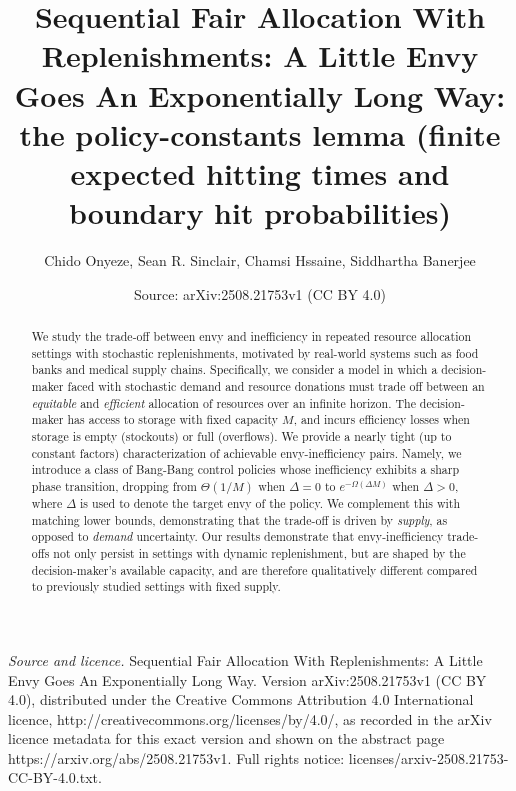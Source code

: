 \documentclass[10pt,a4paper]{amsart}
\title[Policy bounds for finite expected hitting times and boundary hit probabilities]{Sequential Fair Allocation With Replenishments: A Little Envy Goes An Exponentially Long Way: the policy-constants lemma (finite expected hitting times and boundary hit probabilities)}
\author{Chido Onyeze, Sean R. Sinclair, Chamsi Hssaine, Siddhartha Banerjee}
\date{Source: arXiv:2508.21753v1 (CC BY 4.0)}
\theoremstyle{plain}
\theoremstyle{definition}
\theoremstyle{remark}
\begin{document}
\begin{abstract}
We study the trade-off between envy and inefficiency in repeated resource allocation settings with stochastic replenishments, motivated by real-world systems such as food banks and medical supply chains. Specifically, we consider a model in which a decision-maker faced with stochastic demand and resource donations must trade off between an {\it equitable} and {\it efficient} allocation of resources over an infinite horizon. The decision-maker has access to storage with fixed capacity $M$, and incurs efficiency losses when storage is empty (stockouts) or full (overflows). We provide a nearly tight (up to constant factors) characterization of achievable envy-inefficiency pairs. Namely, we introduce a class of Bang-Bang control policies whose inefficiency exhibits a sharp phase transition, dropping from $\Theta(1/M)$ when $\Delta = 0$ to $e^{-\Omega(\Delta M)}$ when $\Delta > 0$, where $\Delta$ is used to denote the target envy of the policy. We complement this with matching lower bounds, demonstrating that the trade-off is driven by {\it supply}, as opposed to {\it demand} uncertainty. Our results demonstrate that envy-inefficiency trade-offs not only persist in settings with dynamic replenishment, but are shaped by the decision-maker's available capacity, and are therefore qualitatively different compared to previously studied settings with fixed supply.


\end{abstract}
\maketitle

\noindent\emph{Source and licence.} Sequential Fair Allocation With Replenishments: A Little Envy Goes An Exponentially Long Way. Version arXiv:2508.21753v1 (CC BY 4.0), distributed under the Creative Commons Attribution 4.0 International licence, http://creativecommons.org/licenses/by/4.0/, as recorded in the arXiv licence metadata for this exact version and shown on the abstract page https://arxiv.org/abs/2508.21753v1. Full rights notice: licenses/arxiv-2508.21753-CC-BY-4.0.txt.\par\smallskip
\end{document}
